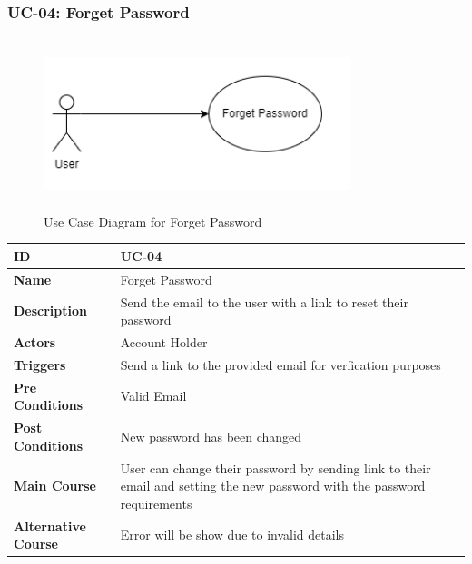 \subsubsection{UC-04: Forget Password}
\begin{figure}[H]
    \includegraphics[height=5cm, width=0.8\textwidth]{./diagrams/Use Case/u4.png}
    \centering
    \caption{Use Case Diagram for Forget Password}
    \label{fig: Usecase1}
\end{figure}

\begin{center}
    \begin{tabularx}{\textwidth}{|l|X|}
        \hline
        \textbf{ID}                 & UC-04                                                                                                                     \\
        \hline
        \textbf{Name}               & Forget Password                                                                                                           \\
        \hline
        \textbf{Description}        & Send the email to the user with a link to reset their password                                                            \\
        \hline
        \textbf{Actors}             & Account Holder                                                                                                            \\
        \hline
        \textbf{Triggers}           & Send a link to the provided email for verfication purposes                                                                \\
        \hline
        \textbf{Pre Conditions}     & Valid Email                                                                                                               \\
        \hline
        \textbf{Post Conditions}    & New password has been changed                                                                                             \\
        \hline
        \textbf{Main Course}        & User can change their password by sending link to their email and setting the new password with the password requirements \\
        \hline
        \textbf{Alternative Course} & Error will be show due to invalid details                                                                                 \\
        \hline
    \end{tabularx}
\end{center}
\newpage


